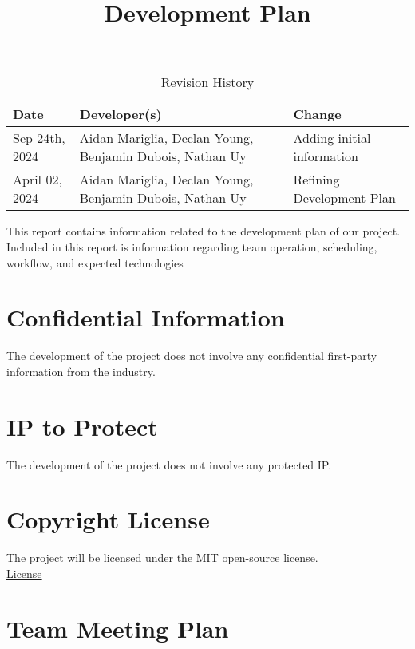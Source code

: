 \documentclass{article}
\title{Development Plan\\\progname}
\author{\authname}
\date{}
\begin{document}
\maketitle

\begin{table}[hp]
\caption{Revision History} \label{TblRevisionHistory}
\begin{tabularx}{\textwidth}{lp{5cm}X}
\toprule
\textbf{Date} & \textbf{Developer(s)} & \textbf{Change}\\
\midrule
Sep 24th, 2024 & Aidan Mariglia, Declan Young, Benjamin Dubois, Nathan Uy & Adding initial information \\
April 02, 2024 & Aidan Mariglia, Declan Young, Benjamin Dubois, Nathan Uy & Refining Development Plan \\
\bottomrule
\end{tabularx}
\end{table}

\newpage{}

This report contains information related to the development plan of our project. Included in this report is information regarding team operation, scheduling, workflow, and expected technologies

\section{Confidential Information}

The development of the project does not involve any confidential first-party information from the industry.

\section{IP to Protect}

The development of the project does not involve any protected IP.

\section{Copyright License}

The project will be licensed under the MIT open-source license. \\
\href{https://github.com/AidanMariglia/SOCAlgoTestPlatform/blob/main/LICENSE}{License}

\section{Team Meeting Plan}
\end{document}
